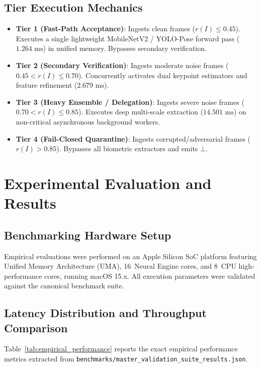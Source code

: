 \documentclass[10pt,journal,compsoc]{IEEEtran}
\begin{document}
\subsection{Tier Execution Mechanics}
\begin{itemize}
    \item \textbf{Tier 1 (Fast-Path Acceptance)}: Ingests clean frames ($r(I) \le 0.45$). Executes a single lightweight MobileNetV2 / YOLO-Pose forward pass ($1.264\text{ ms}$) in unified memory. Bypasses secondary verification.
    \item \textbf{Tier 2 (Secondary Verification)}: Ingests moderate noise frames ($0.45 < r(I) \le 0.70$). Concurrently activates dual keypoint estimators and feature refinement ($2.679\text{ ms}$).
    \item \textbf{Tier 3 (Heavy Ensemble / Delegation)}: Ingests severe noise frames ($0.70 < r(I) \le 0.85$). Executes deep multi-scale extraction ($14.501\text{ ms}$) on non-critical asynchronous background workers.
    \item \textbf{Tier 4 (Fail-Closed Quarantine)}: Ingests corrupted/adversarial frames ($r(I) > 0.85$). Bypasses all biometric extractors and emits $\bot$.
\end{itemize}

\section{Experimental Evaluation and Results}

\subsection{Benchmarking Hardware Setup}
Empirical evaluations were performed on an Apple Silicon SoC platform featuring Unified Memory Architecture (UMA), 16~Neural Engine cores, and 8~CPU high-performance cores, running macOS 15.x. All execution parameters were validated against the canonical benchmark suite.

\subsection{Latency Distribution and Throughput Comparison}
Table~\ref{tab:empirical_performance} reports the exact empirical performance metrics extracted from \texttt{benchmarks/master\_validation\_suite\_results.json}.
\end{document}
